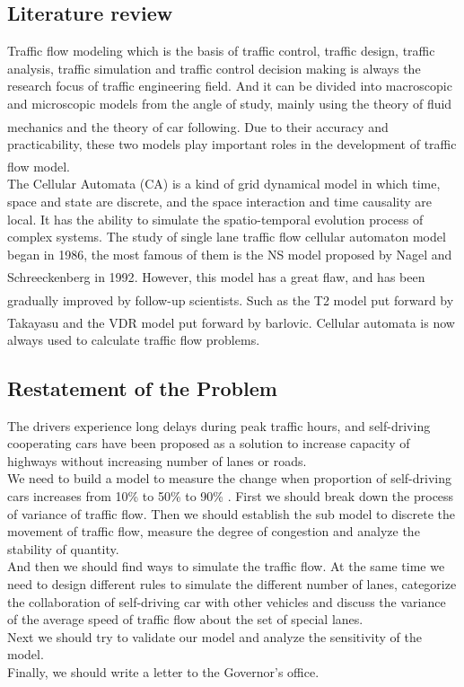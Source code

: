 \documentclass[UTF8]{mcmthesis}
\newcommand{\upcite}[1]{\textsuperscript{\textsuperscript{\cite{#1}}}}
\begin{document}
\subsection{Literature review}
\indent Traffic flow modeling which is the basis of traffic control, traffic design, traffic analysis, traffic simulation and traffic control decision making is always the research focus of traffic engineering field. And it can be divided into macroscopic and microscopic models from the angle of study, mainly using the theory of fluid mechanics and the theory of car following\upcite{TF1}. Due to their accuracy and practicability, these two models play important roles in the development of traffic flow model\upcite{TF2}.\\
\indent The Cellular Automata (CA) is a kind of grid dynamical model in which time, space and state are discrete, and the space interaction and time causality are local. It has the ability to simulate the spatio-temporal evolution process of complex systems. The study of single lane traffic flow cellular automaton model began in 1986, the most famous of them is the NS model proposed by Nagel and Schreeckenberg in 1992\upcite{ca1}. However, this model has a great flaw, and has been gradually improved by follow-up scientists. Such as the T2 model\upcite{ca2} put forward by Takayasu and the VDR model\upcite{ca3} put forward by barlovic. Cellular automata is now always used to calculate traffic flow problems.\\
\indent %



\subsection{Restatement of the Problem}
The drivers experience long delays during peak traffic hours, and self-driving cooperating cars have been proposed as a solution to increase capacity of highways without increasing number of lanes or roads.\\
\indent We need to build a model to measure the change when proportion of self-driving cars increases from  10\% to 50\% to 90\% . First we should break down the process of variance of traffic flow. Then we should establish the sub model to discrete the movement of traffic flow, measure the degree of congestion and analyze the stability of quantity.\\
\indent And then we should find ways to simulate the traffic flow. At the same time we need to design different rules to simulate the different number of lanes, categorize the collaboration of self-driving car with other vehicles and discuss the variance of the average speed of traffic flow about the set of special lanes.\\
\indent Next we should try to validate our model and analyze the sensitivity of the model.\\
\indent Finally, we should write a letter to the Governor's office.
\end{document}
